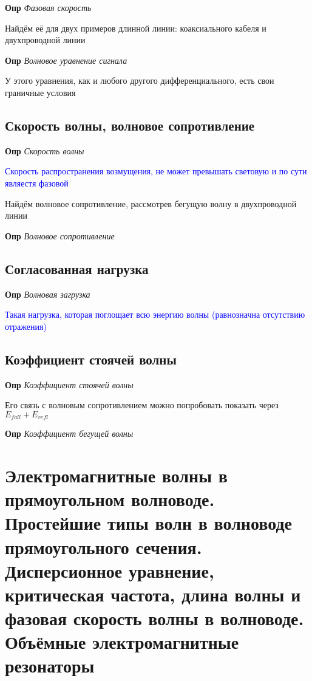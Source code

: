 \documentclass[a4paper, 14pt]{article}
\begin{document}
    \textbf{Опр} \textit{Фазовая скорость}
    
    Найдём её для двух примеров длинной линии: коаксиального кабеля и двухпроводной линии
    
    \textbf{Опр} \textit{Волновое уравнение сигнала}
    
    У этого уравнения, как и любого другого дифференциального, есть свои граничные условия
    
    \subsection{Скорость волны, волновое сопротивление}
    
    \textbf{Опр} \textit{Скорость волны}
    
    \textcolor{blue}{Скорость распространения возмущения, не может превышать световую и по сути являестя фазовой}
    
    Найдём волновое сопротивление, рассмотрев бегущую волну в двухпроводной линии
    
    \textbf{Опр} \textit{Волновое сопротивление}
    
    \subsection{Согласованная нагрузка}
    
    \textbf{Опр} \textit{Волновая загрузка}
    
    \textcolor{blue}{Такая нагрузка, которая поглощает всю энергию волны (равнозначна отсутствию отражения)}
    
    \subsection{Коэффициент стоячей волны}
    
    \textbf{Опр} \textit{Коэффициент стоячей волны}
    
    Его связь с волновым сопротивлением можно попробовать показать через $E_{fall} + E_{refl}$
    
    \textbf{Опр} \textit{Коэффициент бегущей волны}
    
    \section{Электромагнитные волны в прямоугольном волноводе.
    Простейшие типы волн в волноводе прямоугольного сечения.
    Дисперсионное уравнение, критическая частота, длина волны и фазовая скорость волны в волноводе.
    Объёмные электромагнитные резонаторы}
    
\end{document}
